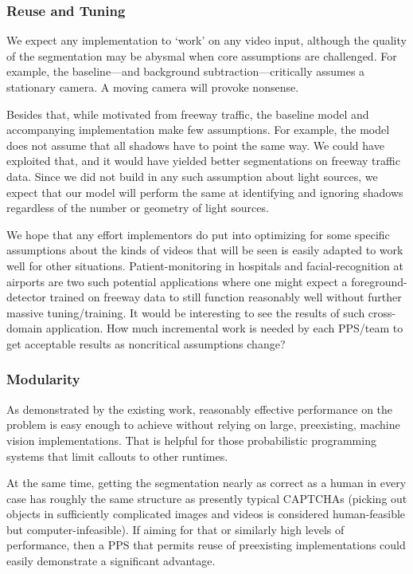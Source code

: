 \subsubsection{Reuse and Tuning}

We expect any implementation to `work' on any video input, although
the quality of the segmentation may be abysmal when core assumptions are
challenged.  For example, the baseline---and background
subtraction---critically assumes a stationary camera.  A moving camera
will provoke nonsense.

Besides that, while motivated from freeway
traffic, the baseline model and accompanying implementation  make few assumptions.
For example, the model does not assume that all shadows have to point
the same way.  We could have exploited that, and it would have yielded
better segmentations on freeway traffic data.  Since we did not build in any such assumption about light
sources, we expect that our model will perform the same at
identifying and ignoring shadows regardless of the number or geometry of light sources.

We hope that
any effort implementors do put into optimizing for some specific
assumptions about the kinds of videos that will be seen is easily
adapted to work well for other situations.  Patient-monitoring in
hospitals and facial-recognition at airports are two such potential applications
where one might expect a foreground-detector trained on freeway data
to still function reasonably well without further massive tuning/training.
It would be interesting to see the results of such cross-domain
application.  How much incremental work is needed by each PPS/team to get
acceptable results as noncritical assumptions change?


\subsubsection{Modularity}

As demonstrated by the existing work,
reasonably effective performance on the problem is easy enough to
achieve without relying on large, preexisting, machine vision
implementations.  That is helpful for those probabilistic programming
systems that limit callouts to other runtimes.

At the same time, getting the segmentation nearly as correct as a
human in every case has roughly the same structure as presently typical
CAPTCHAs (picking out objects in sufficiently complicated images and
videos is considered human-feasible but computer-infeasible).
If aiming for that or similarly high
levels of performance, then a PPS that permits reuse of
preexisting implementations could easily demonstrate a significant
advantage.


